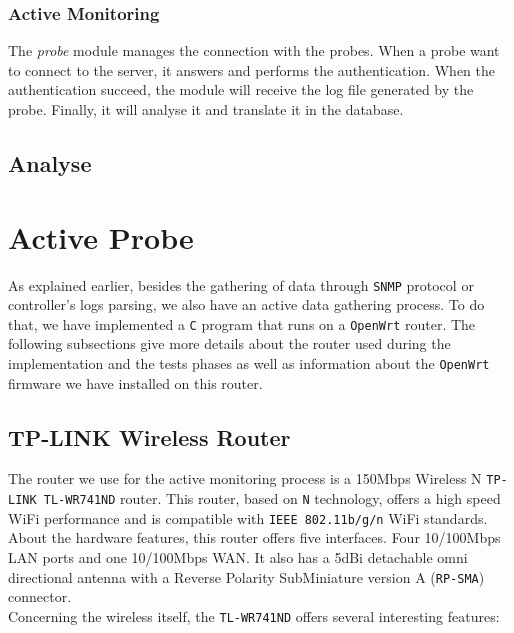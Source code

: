 \subsubsection{Active Monitoring}
The \emph{probe} module manages the connection with the probes. When a probe want to connect to the server, it answers and performs the authentication. When the authentication succeed, the module will receive the log file generated by the probe. Finally, it will analyse it and translate it in the database.

\subsection{Analyse}


\section{Active Probe}
As explained earlier, besides the gathering of data through \texttt{SNMP} protocol or controller's logs parsing, we also have an active data gathering process. To do that, we have implemented a \texttt{C} program that runs on a \texttt{OpenWrt} router. The following subsections give more details about the router used during the implementation and the tests phases as well as information about the \texttt{OpenWrt} firmware we have installed on this router.\\

\subsection{TP-LINK Wireless Router}
The router we use for the active monitoring process is a 150Mbps Wireless N \texttt{TP-LINK TL-WR741ND} router. This router, based on \texttt{N} technology, offers a high speed WiFi performance and is compatible with \texttt{IEEE 802.11b/g/n} WiFi standards. \\
About the hardware features, this router offers five interfaces. Four 10/100Mbps LAN ports and one 10/100Mbps WAN. It also has a 5dBi detachable omni directional antenna with a Reverse Polarity SubMiniature version A (\texttt{RP-SMA}) connector.\\
Concerning the wireless itself, the \texttt{TL-WR741ND} offers several interesting features\cite{tplink}:

